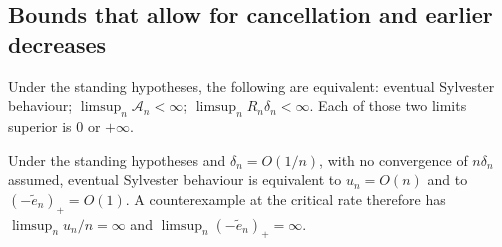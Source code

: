 \documentclass[11pt]{article}
\begin{document}
\subsection{Bounds that allow for cancellation and earlier decreases}

\begin{theorem}\label{long243:res:recordamplified}
Under the standing hypotheses, the following are equivalent: eventual Sylvester behaviour; $\limsup_n\mathcal A_n<\infty$;
$\limsup_nR_n\delta_n<\infty$.  Each of those two limits superior is $0$ or
$+\infty$.
\end{theorem}

\begin{corollary}\label{long243:res:criticalrate}
Under the standing hypotheses and $\delta_n=O(1/n)$, with no convergence of $n\delta_n$ assumed,
eventual Sylvester behaviour is equivalent to $u_n=O(n)$ and to $(-\tilde e_n)_+=O(1)$.  A
counterexample at the critical rate therefore has $\limsup_nu_n/n=\infty$ and
$\limsup_n(-\tilde e_n)_+=\infty$.
\end{corollary}
\end{document}
